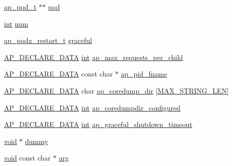 \begin{DoxyCompactItemize}
\item 
\hyperlink{structap__pod__t}{ap\+\_\+pod\+\_\+t} $\ast$$\ast$ \hyperlink{group__APACHE__MPM_gab7a2e318cb3c9cd07d5fd77ee676e10f}{pod}
\item 
\hyperlink{pcre_8txt_a42dfa4ff673c82d8efe7144098fbc198}{int} \hyperlink{group__APACHE__MPM_ga86cf672daa4e0ad11ad10efc894d19c8}{num}
\item 
\hyperlink{group__APACHE__MPM_gacd6b02ad1bfe3abd64999dc5e38e6633}{ap\+\_\+podx\+\_\+restart\+\_\+t} \hyperlink{group__APACHE__MPM_gaff92bd6d0833f5e3dcae5f22f420f9e8}{graceful}
\item 
\hyperlink{ap__config_8h_a0bb4c3adf74510a0dcdad5b125725fe0}{A\+P\+\_\+\+D\+E\+C\+L\+A\+R\+E\+\_\+\+D\+A\+TA} \hyperlink{pcre_8txt_a42dfa4ff673c82d8efe7144098fbc198}{int} \hyperlink{group__APACHE__MPM_gaf4270d01cbd55f46555b0c04325bb7d0}{ap\+\_\+max\+\_\+requests\+\_\+per\+\_\+child}
\item 
\hyperlink{ap__config_8h_a0bb4c3adf74510a0dcdad5b125725fe0}{A\+P\+\_\+\+D\+E\+C\+L\+A\+R\+E\+\_\+\+D\+A\+TA} const char $\ast$ \hyperlink{group__APACHE__MPM_ga4bb083f6085cef22dd8d12343eea4328}{ap\+\_\+pid\+\_\+fname}
\item 
\hyperlink{ap__config_8h_a0bb4c3adf74510a0dcdad5b125725fe0}{A\+P\+\_\+\+D\+E\+C\+L\+A\+R\+E\+\_\+\+D\+A\+TA} char \hyperlink{group__APACHE__MPM_ga3516dc99a8e352b4a552f7aa9bd528bc}{ap\+\_\+coredump\+\_\+dir} \mbox{[}\hyperlink{passwd__common_8h_a4fa9aad0e9c7cc2e344b679cdbb2b67d}{M\+A\+X\+\_\+\+S\+T\+R\+I\+N\+G\+\_\+\+L\+EN}\mbox{]}
\item 
\hyperlink{ap__config_8h_a0bb4c3adf74510a0dcdad5b125725fe0}{A\+P\+\_\+\+D\+E\+C\+L\+A\+R\+E\+\_\+\+D\+A\+TA} \hyperlink{pcre_8txt_a42dfa4ff673c82d8efe7144098fbc198}{int} \hyperlink{group__APACHE__MPM_gae197fcd0a6b0338f66b275d588b17cc7}{ap\+\_\+coredumpdir\+\_\+configured}
\item 
\hyperlink{ap__config_8h_a0bb4c3adf74510a0dcdad5b125725fe0}{A\+P\+\_\+\+D\+E\+C\+L\+A\+R\+E\+\_\+\+D\+A\+TA} \hyperlink{pcre_8txt_a42dfa4ff673c82d8efe7144098fbc198}{int} \hyperlink{group__APACHE__MPM_gaf1028e44b07ba997c941aa34fea48325}{ap\+\_\+graceful\+\_\+shutdown\+\_\+timeout}
\item 
\hyperlink{group__MOD__ISAPI_gacd6cdbf73df3d9eed42fa493d9b621a6}{void} $\ast$ \hyperlink{group__APACHE__MPM_ga99dc3b67257851cb91efea473083cd0f}{dummy}
\item 
\hyperlink{group__MOD__ISAPI_gacd6cdbf73df3d9eed42fa493d9b621a6}{void} const char $\ast$ \hyperlink{group__APACHE__MPM_gaf6517210150d97cd5cb8a17e3768770d}{arg}
$$
\end{DoxyCompactItemize}
